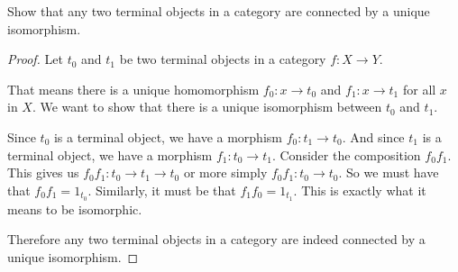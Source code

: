 \documentclass[main.tex]{subfiles}
\begin{document}
\begin{exercise}
	Show that any two terminal objects in a category are connected by a unique
	isomorphism.
\end{exercise}

\begin{proof}
Let $t_0$ and $t_1$ be two terminal objects in a category $f: X \rightarrow Y$.

That means there is a unique homomorphism $f_0: x \rightarrow t_0$ and $f_1: x
\rightarrow t_1$ for all $x$ in $X$. We want to show that there is a unique
isomorphism between $t_0$ and $t_1$.


Since $t_0$ is a terminal object, we have a morphism $f_0: t_1 \rightarrow t_0$.
And since $t_1$ is a terminal object, we have a morphism $f_1: t_0 \rightarrow
t_1$. Consider the composition $f_0 f_1$. This gives us $f_0 f_1: t_0
\rightarrow t_1 \rightarrow t_0$ or more simply $f_0 f_1: t_0 \rightarrow t_0$.
So we must have that $f_0 f_1 = 1_{t_0}$. Similarly, it must be that $f_1 f_0 =
1_{t_1}$. This is exactly what it means to be isomorphic.

Therefore any two terminal objects in a category are indeed connected by a
unique isomorphism.

\end{proof}
\end{document}

